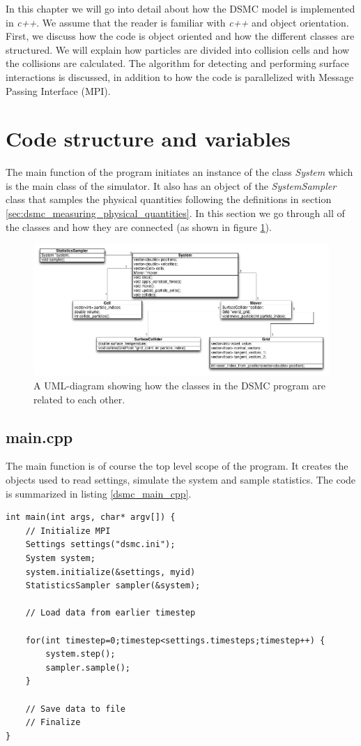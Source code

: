 In this chapter we will go into detail about how the DSMC model is implemented in \textit{c++}. We assume that the reader is familiar with \textit{c++} and object orientation. First, we discuss how the code is object oriented and how the different classes are structured. We will explain how particles are divided into collision cells and how the collisions are calculated. The algorithm for detecting and performing surface interactions is discussed, in addition to how the code is parallelized with Message Passing Interface (MPI). 
\section{Code structure and variables}
The main function of the program initiates an instance of the class \textit{System} which is the main class of the simulator. It also has an object of the \textit{SystemSampler} class that samples the physical quantities following the definitions in section \ref{sec:dsmc_measuring_physical_quantities}. In this section we go through all of the classes and how they are connected (as shown in figure \ref{fig:dsmc_uml_diagram}). 
\begin{figure}[h]
\begin{center}
\includegraphics[width=\textwidth, trim=0cm 0cm 0cm 0cm, clip]{DSMC/figures/dsmcuml.png}
\end{center}
\caption{A UML-diagram showing how the classes in the DSMC program are related to each other.}
\label{fig:dsmc_uml_diagram}
\end{figure}
\subsection{main.cpp}
The main function is of course the top level scope of the program. It creates the objects used to read settings, simulate the system and sample statistics. The code is summarized in listing \ref{dsmc_main_cpp}.
\begin{lstlisting}[caption=main.cpp, label=lst:dsmc_main_cpp]
int main(int args, char* argv[]) {
    // Initialize MPI
    Settings settings("dsmc.ini");
    System system;
    system.initialize(&settings, myid)
    StatisticsSampler sampler(&system);
    
    // Load data from earlier timestep

    for(int timestep=0;timestep<settings.timesteps;timestep++) {
    	system.step();
    	sampler.sample();
    }

    // Save data to file
    // Finalize
}
\end{lstlisting}
